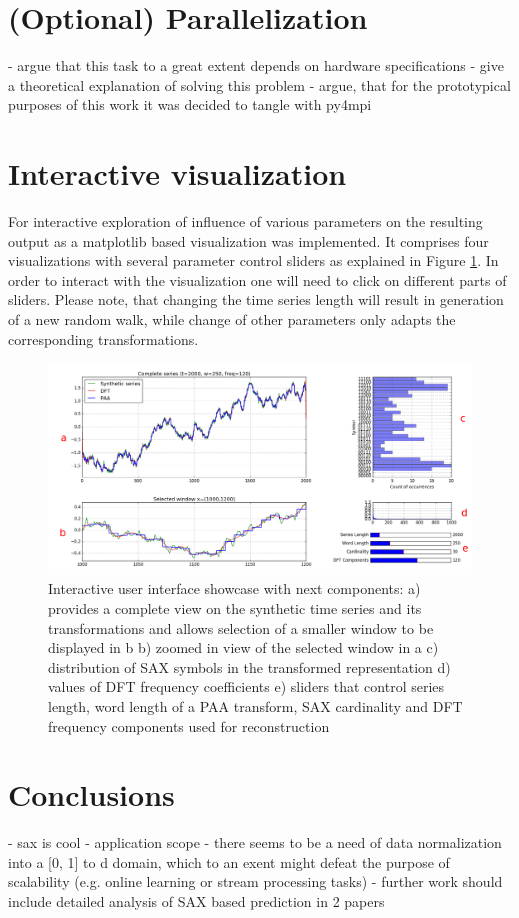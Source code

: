 \documentclass{article}
\begin{document}
\section{(Optional) Parallelization}
- argue that this task to a great extent depends on hardware specifications
- give a theoretical explanation of solving this problem
- argue, that for the prototypical purposes of this work it was decided to tangle with py4mpi

\section{Interactive visualization}
For interactive exploration of influence of various parameters on the resulting output as a matplotlib based visualization was implemented. It comprises four visualizations with several parameter control sliders as explained in Figure \ref{fig:2}. In order to interact with the visualization one will need to click on different parts of sliders. Please note, that changing the time series length will result in generation of a new random walk, while change of other parameters only adapts the corresponding transformations.
\begin{figure}[h!]
	\begin{center}
		\includegraphics[width=\textwidth]{images/vis-labeled.png}
		\caption{Interactive user interface showcase with next components: a) provides a complete view on the synthetic time series and its transformations and allows selection of a smaller window to be displayed in b b) zoomed in view of the selected window in a c) distribution of SAX symbols in the transformed representation d) values of DFT frequency coefficients e) sliders that control series length, word length of a PAA transform, SAX cardinality and DFT frequency components used for reconstruction}
		\label{fig:2}
	\end{center}
\end{figure}

\section{Conclusions}
- sax is cool
- application scope
- there seems to be a need of data normalization into a [0, 1] to d domain, which to an exent might defeat the purpose of scalability (e.g. online learning or stream processing tasks)
- further work should include detailed analysis of SAX based prediction in 2 papers




\end{document}
